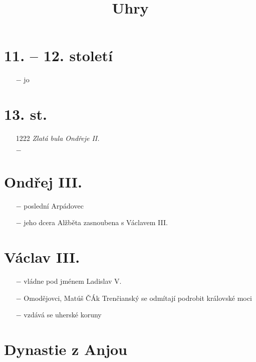 \documentclass{article}
\title{\vspace{-2cm}Uhry\vspace{-1.7cm}}
\date{}
\author{}
\begin{document}
\maketitle

\section*{11. -- 12. století}
\begin{itemize}
    \vspace{-0.5em}
    \setlength\itemsep{0.15em}
    \item[$-$] jo
\end{itemize}

\section*{13. st.}
\begin{itemize}
    \vspace{-0.5em}
    \setlength\itemsep{0.15em}
    \item[1222] \textit{Zlatá bula Ondřeje II.}
    \item[$-$]
\end{itemize}

\section*{Ondřej III.}
\begin{itemize}
    \vspace{-0.5em}
    \setlength\itemsep{0.15em}
    \item[$-$] poslední Arpádovec
    \item[$-$] jeho dcera Alžběta zasnoubena s Václavem III.
\end{itemize}

\section*{Václav III.}
\begin{itemize}
    \vspace{-0.5em}
    \setlength\itemsep{0.15em}
    \item[$-$] vládne pod jménem Ladislav V.
    \item[$-$] Omodějovci, Matúš ČÁk Trenčianský se odmítají podrobit královské moci
    \item[$-$] vzdává se uherské koruny
\end{itemize}


\section*{Dynastie z Anjou}
\end{document}
